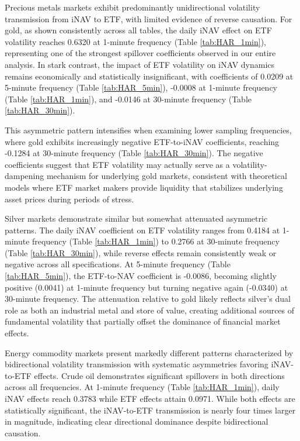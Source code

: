 Precious metals markets exhibit predominantly unidirectional volatility transmission from iNAV to ETF, with limited evidence of reverse causation. For gold, as shown consistently across all tables, the daily iNAV effect on ETF volatility reaches 0.6320 at 1-minute frequency (Table \ref{tab:HAR_1min}), representing one of the strongest spillover coefficients observed in our entire analysis. In stark contrast, the impact of ETF volatility on iNAV dynamics remains economically and statistically insignificant, with coefficients of 0.0209 at 5-minute frequency (Table \ref{tab:HAR_5min}), -0.0008 at 1-minute frequency (Table \ref{tab:HAR_1min}), and -0.0146 at 30-minute frequency (Table \ref{tab:HAR_30min}).

This asymmetric pattern intensifies when examining lower sampling frequencies, where gold exhibits increasingly negative ETF-to-iNAV coefficients, reaching -0.1284 at 30-minute frequency (Table \ref{tab:HAR_30min}). The negative coefficients suggest that ETF volatility may actually serve as a volatility-dampening mechanism for underlying gold markets, consistent with theoretical models where ETF market makers provide liquidity that stabilizes underlying asset prices during periods of stress.

Silver markets demonstrate similar but somewhat attenuated asymmetric patterns. The daily iNAV coefficient on ETF volatility ranges from 0.4184 at 1-minute frequency (Table \ref{tab:HAR_1min}) to 0.2766 at 30-minute frequency (Table \ref{tab:HAR_30min}), while reverse effects remain consistently weak or negative across all specifications. At 5-minute frequency (Table \ref{tab:HAR_5min}), the ETF-to-NAV coefficient is -0.0086, becoming slightly positive (0.0041) at 1-minute frequency but turning negative again (-0.0340) at 30-minute frequency. The attenuation relative to gold likely reflects silver's dual role as both an industrial metal and store of value, creating additional sources of fundamental volatility that partially offset the dominance of financial market effects.

Energy commodity markets present markedly different patterns characterized by bidirectional volatility transmission with systematic asymmetries favoring iNAV-to-ETF effects. Crude oil demonstrates significant spillovers in both directions across all frequencies. At 1-minute frequency (Table \ref{tab:HAR_1min}), daily iNAV effects reach 0.3783 while ETF effects attain 0.0971. While both effects are statistically significant, the iNAV-to-ETF transmission is nearly four times larger in magnitude, indicating clear directional dominance despite bidirectional causation.

